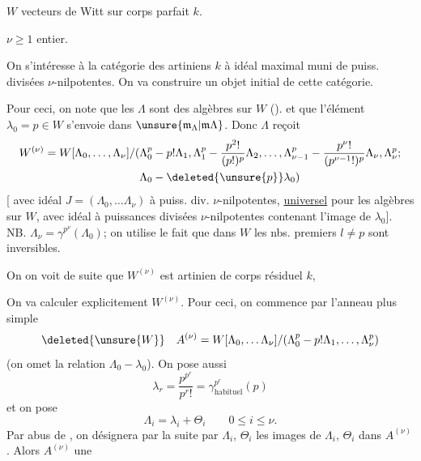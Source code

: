 $W$ vecteurs de Witt sur corps parfait $k$.

$\nu\geq1$ entier.

On s'intéresse à la catégorie des   artiniens   $k$ à idéal maximal muni de puiss. divisées $\nu$-nilpotentes. On va construire un objet initial de cette catégorie.

Pour ceci, on note que les $\Lambda$ sont des algèbres sur $W$ (). et que l'élément $\lambda_0=p\in W$ s'envoie dans $\unsure{\mathfrak{m}_{\Lambda}|\mathfrak{m}\Lambda}$. Donc $\Lambda$ reçoit
\[
\begin{split}
W^{(\nu)}=W[\Lambda_0,\ldots,\Lambda_\nu]/(&\Lambda_0^p-p!\Lambda_1,\Lambda_1^p-\frac{p^2!}{(p!)^p}\Lambda_2,\ldots,\Lambda_{\nu-1}^p-\frac{p^\nu!}{(p^{\nu-1}!)^p}\Lambda_\nu,\Lambda_\nu^p;\\
&\Lambda_0-\deleted{\unsure{p}}\lambda_0)
\end{split}
\]
[  avec idéal $J=(\Lambda_0,\ldots\Lambda_\nu)$ à puiss. div. $\nu$-nilpotentes, \uline{universel} pour les algèbres sur $W$, avec idéal à puissances divisées $\nu$-nilpotentes contenant l'image de $\lambda_0$]. NB. $\Lambda_\nu=\gamma^{p^\nu}(\Lambda_0)$; on utilise le fait que dans $W$ les nbs. premiers $l\ne p$ sont inversibles.

On  on voit de suite que $W^{(\nu)}$ est artinien de corps résiduel $k$,  

On va calculer explicitement $W^{(\nu)}$. Pour ceci,  on commence par l'anneau plus simple
\[
\deleted{\unsure{W}}\quad A^{(\nu)}=W[\Lambda_0,\ldots\Lambda_\nu]/(\Lambda_0^p-p!\Lambda_1,\ldots,\Lambda_\nu^p)
\]
(on omet la relation $\Lambda_0-\lambda_0$). On pose aussi
\[
\lambda_r=\frac{p^{p^r}}{p^r!}=\gamma^{p^r}_{\text{habituel}}(p)
\]
et on pose
\[
\Lambda_i=\lambda_i+\Theta_i\qquad 0\leq i\leq\nu.
\]
Par abus de , on désignera par la suite par $\Lambda_i$, $\Theta_i$ les images de $\Lambda_i$, $\Theta_i$ dans $A^{(\nu)}$. Alors $A^{(\nu)}$  une

